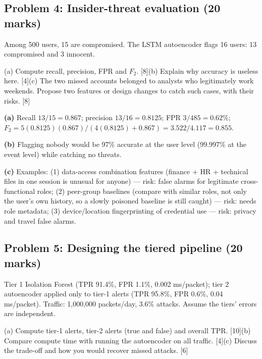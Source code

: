 \documentclass[11pt]{article}
\begin{document}
\subsection{Problem 4: Insider-threat evaluation \normalfont\small\color{GreyN}(20 marks)}

\begin{prob}Among 500 users, 15 are compromised. The LSTM autoencoder flags 16 users: 13 compromised and 3 innocent.

(a) Compute recall, precision, FPR and $F_2$. [8]\newline (b) Explain why accuracy is useless here. [4]\newline (c) The two missed accounts belonged to analysts who legitimately work weekends. Propose two features or design changes to catch such cases, with their risks. [8]\end{prob}

\begin{soln}\textbf{(a)} Recall $13/15=\mathbf{0.867}$; precision $13/16=\mathbf{0.8125}$; FPR $3/485=\mathbf{0.62\%}$; $F_2=5(0.8125)(0.867)/(4(0.8125)+0.867)=3.522/4.117=\mathbf{0.855}$.

\textbf{(b)} Flagging nobody would be 97\% accurate at the user level (99.997\% at the event level) while catching no threats.

\textbf{(c)} Examples: (1) data-access combination features (finance + HR + technical files in one session is unusual for anyone) --- risk: false alarms for legitimate cross-functional roles; (2) peer-group baselines (compare with similar roles, not only the user's own history, so a slowly poisoned baseline is still caught) --- risk: needs role metadata; (3) device/location fingerprinting of credential use --- risk: privacy and travel false alarms.\end{soln}

\subsection{Problem 5: Designing the tiered pipeline \normalfont\small\color{GreyN}(20 marks)}

\begin{prob}Tier 1 Isolation Forest (TPR 91.4\%, FPR 1.1\%, 0.002 ms/packet); tier 2 autoencoder applied only to tier-1 alerts (TPR 95.8\%, FPR 0.6\%, 0.04 ms/packet). Traffic: 1,000,000 packets/day, 3.6\% attacks. Assume the tiers' errors are independent.

(a) Compute tier-1 alerts, tier-2 alerts (true and false) and overall TPR. [10]\newline (b) Compare compute time with running the autoencoder on all traffic. [4]\newline (c) Discuss the trade-off and how you would recover missed attacks. [6]\end{prob}
\end{document}
